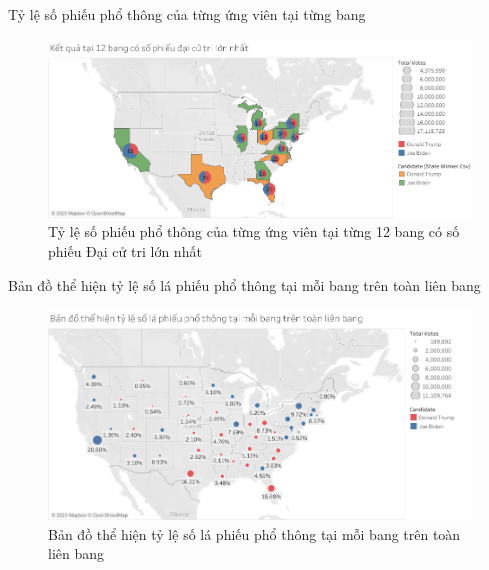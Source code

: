 \documentclass[10pt]{beamer}
\theoremstyle{remark}
\theoremstyle{definition}
\begin{document}
\begin{frame}{Tỷ lệ số phiếu phổ thông của từng ứng viên tại từng bang}
	\begin{figure}[h!]
        \centering
        \includegraphics[width=\textwidth]{figures/12_Electoral_Vote_State_Candidate_Win.png}
        \caption{Tỷ lệ số phiếu phổ thông của từng ứng viên tại từng 12 bang có số phiếu Đại cử tri lớn nhất}
    \end{figure}
\end{frame}

\begin{frame}{Bản đồ thể hiện tỷ lệ số lá phiếu phổ thông tại mỗi bang trên toàn liên bang}
	\begin{figure}[h!]
        \centering
        \includegraphics[width=\textwidth]{State_Percentage_Vote_Circle.png}
        \caption{Bản đồ thể hiện tỷ lệ số lá phiếu phổ thông tại mỗi bang trên toàn liên bang}
    \end{figure}
\end{frame}
\end{document}
